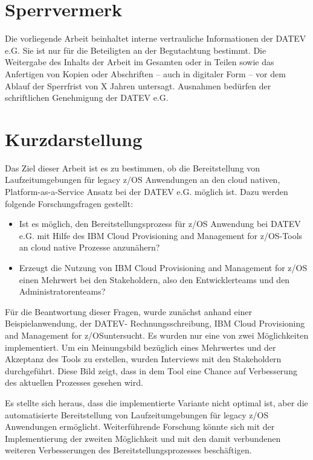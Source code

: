 \thispagestyle{empty}
\section*{Sperrvermerk}
Die vorliegende Arbeit beinhaltet interne vertrauliche Informationen der DATEV e.G.
Sie ist nur für die Beteiligten an der Begutachtung bestimmt.
Die Weitergabe des Inhalts der Arbeit im Gesamten oder in Teilen sowie das Anfertigen von Kopien oder Abschriften – auch in digitaler Form – vor dem Ablauf der Sperrfrist von X Jahren untersagt.
Ausnahmen bedürfen der schriftlichen Genehmigung der DATEV e.G.



\newpage
\section*{Kurzdarstellung}
\label{sec:kurzdarstellung}
Das Ziel dieser Arbeit ist es zu bestimmen, ob die Bereitstellung von Laufzeitumgebungen für legacy z/OS Anwendungen an den cloud nativen, Platform-as-a-Service Ansatz bei der DATEV e.G. möglich ist.
Dazu werden folgende Forschungsfragen gestellt:
\begin{itemize}
\item Ist es möglich, den Bereitstellungsprozess für z/OS Anwendung bei DATEV e.G. mit Hilfe des \glqq IBM Cloud Provisioning and Management for z/OS\grqq-Tools an cloud native Prozesse anzunähern?
\item Erzeugt die Nutzung von \glqq IBM Cloud Provisioning and Management for z/OS\grqq{} einen Mehrwert bei den Stakeholdern, also den Entwicklerteams und den Administratorenteams?
\end{itemize}

Für die Beantwortung dieser Fragen, wurde zunächst anhand einer Beispielanwendung, der DATEV- Rechnungsschreibung, \glqq IBM Cloud Provisioning and Management for z/OS\grqq untersucht.
Es wurden nur eine von zwei Möglichkeiten implementiert.
Um ein Meinungsbild bezüglich eines Mehrwertes und der Akzeptanz  des Tools zu erstellen, wurden Interviews mit den Stakeholdern durchgeführt.
Diese Bild zeigt, dass in dem Tool eine Chance auf Verbesserung des aktuellen Prozesses gesehen wird.

Es stellte sich heraus, dass die implementierte Variante nicht optimal ist, aber die automatisierte Bereitstellung von Laufzeitumgebungen für legacy z/OS Anwendungen ermöglicht.
Weiterführende Forschung könnte sich mit der Implementierung der zweiten Möglichkeit und mit den damit verbundenen weiteren Verbesserungen des Bereitstellungsprozesses beschäftigen.

